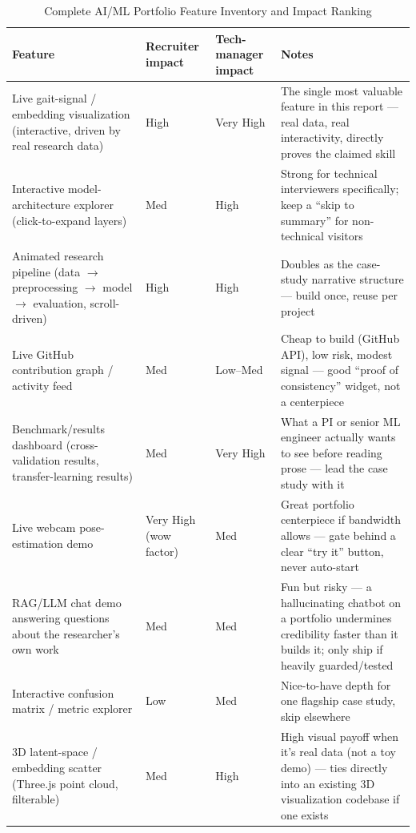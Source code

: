 \documentclass[conference]{IEEEtran}
\begin{document}
\begin{table}[t]
\centering
\caption{Complete AI/ML Portfolio Feature Inventory and Impact Ranking}
\label{tab:aifeat_full}
\begin{tabular}{L{4.5cm}C{2.0cm}C{2.0cm}L{7.0cm}}
\toprule
\textbf{Feature} & \textbf{Recruiter impact} & \textbf{Tech-manager impact} & \textbf{Notes} \\
\midrule
Live gait-signal / embedding visualization (interactive, driven by real research data) & High & Very High & The single most valuable feature in this report --- real data, real interactivity, directly proves the claimed skill \\
Interactive model-architecture explorer (click-to-expand layers) & Med & High & Strong for technical interviewers specifically; keep a ``skip to summary'' for non-technical visitors \\
Animated research pipeline (data $\to$ preprocessing $\to$ model $\to$ evaluation, scroll-driven) & High & High & Doubles as the case-study narrative structure --- build once, reuse per project \\
Live GitHub contribution graph / activity feed & Med & Low--Med & Cheap to build (GitHub API), low risk, modest signal --- good ``proof of consistency'' widget, not a centerpiece \\
Benchmark/results dashboard (cross-validation results, transfer-learning results) & Med & Very High & What a PI or senior ML engineer actually wants to see before reading prose --- lead the case study with it \\
Live webcam pose-estimation demo & Very High (wow factor) & Med & Great portfolio centerpiece if bandwidth allows --- gate behind a clear ``try it'' button, never auto-start \\
RAG/LLM chat demo answering questions about the researcher's own work & Med & Med & Fun but risky --- a hallucinating chatbot on a portfolio undermines credibility faster than it builds it; only ship if heavily guarded/tested \\
Interactive confusion matrix / metric explorer & Low & Med & Nice-to-have depth for one flagship case study, skip elsewhere \\
3D latent-space / embedding scatter (Three.js point cloud, filterable) & Med & High & High visual payoff when it's real data (not a toy demo) --- ties directly into an existing 3D visualization codebase if one exists \\
\bottomrule
\end{tabular}
\end{table}
\end{document}
